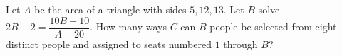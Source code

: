 Let $A$ be the area of a triangle with sides $5,12,13$. Let $B$ solve $2B-2=\dfrac{10B+10}{A-20}$. How many ways $C$ can $B$ people be selected from eight distinct people and assigned to seats numbered $1$ through $B$?
